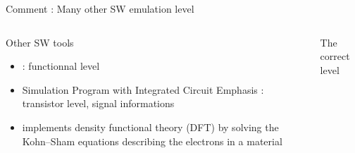 \begin{Frame}{Comment : Many other SW emulation level}
 \begin{columns}[t]
  \begin{column}{\BW}
    \begin{block}{Other SW tools}
      \begin{itemize}
        \item {} : functionnal level 
        \item {} Simulation Program with Integrated Circuit
          Emphasis : transistor level, signal informations
        \item {} implements density functional theory (DFT) by
          solving the Kohn–Sham equations describing the electrons in
          a material
      \end{itemize}
    \end{block}
  \end{column}  \begin{column}{\BW}
    \begin{block}{The correct level}
      
    \end{block}
  \end{column}
 \end{columns}
\end{Frame}
